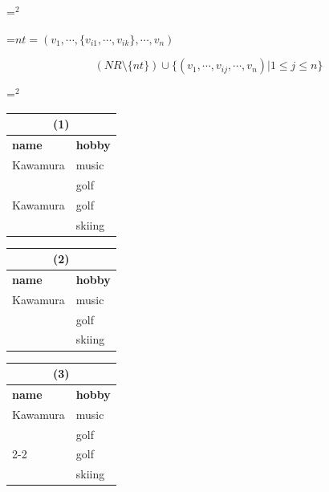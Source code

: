 {\newpage
\clearpage
\samepage \setbox\sizebox=\hbox{$^2$}\box\sizebox
}

{\newpage
\clearpage
\samepage \setbox\sizebox=\hbox{$nt=(v_1,\cdots,\{v_{i1},\cdots,v_{ik}\},\cdots,v_n)$}\box\sizebox
}

{\newpage
\clearpage
\samepage \begin{displaymath}(NR\setminus\{nt\})\cup
	\{(v_1,\cdots,v_{ij},\cdots,v_n)|1\leq j\leq n\}\end{displaymath}
}

{\newpage
\clearpage
\samepage \setbox\sizebox=\hbox{$^2$}\box\sizebox
}

{\newpage
\clearpage
\samepage \begin{table}[ht]
\begin{center}
\label{t:nr1}

\begin{tabular}[t]{|l|l|}
\multicolumn{2}{c}{(1)}\\ \hline
{\bf name}	&{\bf hobby}\\ \hline
Kawamura	&music\\ [-2mm]
		&golf\\ \hline
Kawamura	&golf\\ [-2mm]
		&skiing\\ \hline
\end{tabular}\hspace{5mm}
\begin{tabular}[t]{|l|l|}
\multicolumn{2}{c}{(2)}\\ \hline
{\bf name}	&{\bf hobby}\\ \hline
Kawamura	&music\\ [-2mm]
		&golf\\ [-2mm]
		&skiing\\ \hline
\end{tabular}\hspace{5mm}
\begin{tabular}[t]{|l|l|}
\multicolumn{2}{c}{(3)}\\ \hline
{\bf name}	&{\bf hobby}\\ \hline
Kawamura	&music\\ [-2mm]
		&golf\\ \cline{2-2}
		&golf\\ [-2mm]
		&skiing\\ \hline
\end{tabular}

\end{center}
\end{table}
}

